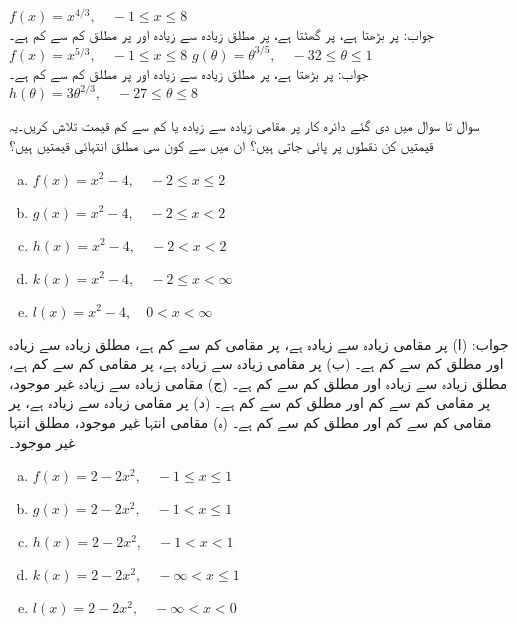 $f(x)=x^{4/3},\quad -1\le x\le 8$\\
جواب:\quad
{} پر بڑھتا ہے،  پر گھٹتا ہے،  پر مطلق زیادہ سے زیادہ  اور  پر مطلق کم سے کم  ہے۔
$f(x)=x^{5/3},\quad -1\le x\le 8$
$g(\theta)=\theta^{3/5},\quad -32\le \theta \le 1$\\
جواب:\quad
{} پر بڑھتا ہے،  پر مطلق زیادہ سے زیادہ  اور  پر مطلق کم سے کم  ہے۔
$h(\theta)=3\theta^{2/3},\quad -27\le \theta\le 8$

سوال  تا سوال  میں دی گئے دائرہ کار پر مقامی زیادہ سے زیادہ یا کم سے کم قیمت تلاش کریں۔یہ قیمتیں کن نقطوں پر پائی جاتی ہیں؟ ان میں سے کون سی مطلق انتہائی قیمتیں ہیں؟ 

\begin{multicols}{2}
\begin{enumerate}[a.]
\item
$f(x)=x^2-4,\quad -2\le x\le 2$
\item
$g(x)=x^2-4,\quad -2\le x<2$
\item
$h(x)=x^2-4,\quad -2<x<2$
\item
$k(x)=x^2-4,\quad -2\le x<\infty$
\item
$l(x)=x^2-4,\quad 0<x<\infty$
\end{enumerate}
\end{multicols}
جواب:\quad
(ا)  پر مقامی زیادہ سے زیادہ  ہے،  پر مقامی کم سے کم  ہے، مطلق زیادہ سے زیادہ  اور مطلق کم سے کم  ہے۔
 (ب)  پر مقامی زیادہ سے زیادہ  ہے،  پر مقامی کم سے کم  ہے، مطلق زیادہ سے زیادہ  اور مطلق کم سے کم  ہے۔
 (ج) مقامی زیادہ سے زیادہ غیر موجود،  پر مقامی کم سے کم  اور مطلق کم سے کم  ہے۔ 
 (د)  پر مقامی زیادہ سے زیادہ  ہے،  پر مقامی کم سے کم  اور مطلق کم سے کم  ہے۔
 (ہ) مقامی انتہا غیر موجود،  مطلق انتہا غیر موجود۔
\begin{multicols}{2}
\begin{enumerate}[a.]
\item
$f(x)=2-2x^2,\quad -1\le x\le 1$
\item
$g(x)=2-2x^2,\quad -1<x\le 1$
\item
$h(x)=2-2x^2,\quad -1<x<1$
\item
$k(x)=2-2x^2,\quad -\infty<x\le 1$
\item
$l(x)=2-2x^2,\quad -\infty<x<0$
\end{enumerate}
\end{multicols}

